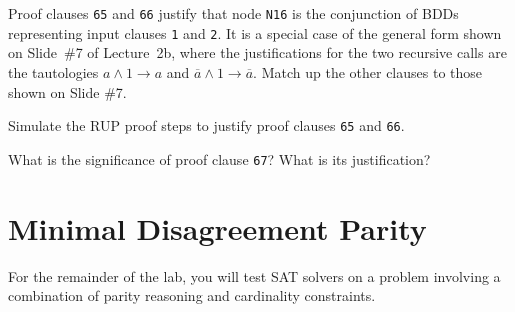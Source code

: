 \begin{choice}
\item
Proof clauses \texttt{65} and \texttt{66} justify that
node \texttt{N16} is the conjunction of BDDs representing input
clauses \texttt{1} and \texttt{2}.  It is a special case of the
general form shown on Slide~\#7 of Lecture~2b, where the
justifications for the two recursive calls are the tautologies
$a \land 1 \rightarrow a$ and $\overline{a} \land 1 \rightarrow \overline{a}$.
Match up the other clauses to those shown on Slide \#7.


\item 
Simulate the RUP proof steps to justify proof clauses \texttt{65} and \texttt{66}.


\item
What is the significance of proof clause \texttt{67}?  What is its justification?

\end{choice}

\newpage
\section*{Minimal Disagreement Parity}

\newcommand{\ints}[1]{{\cal N}_{#1}}
\newcommand{\bset}{{\cal B}}


For the remainder of the lab, you will test SAT solvers on a problem
involving a combination of parity reasoning and cardinality
constraints.

